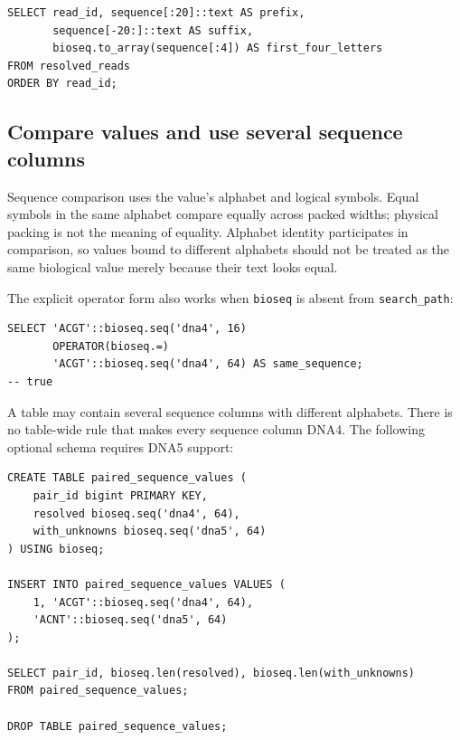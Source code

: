 \par\noindent\begin{minipage}{\linewidth}
\begin{lstlisting}[style=bioseq-appendix-sql]
SELECT read_id, sequence[:20]::text AS prefix,
       sequence[-20:]::text AS suffix,
       bioseq.to_array(sequence[:4]) AS first_four_letters
FROM resolved_reads
ORDER BY read_id;
\end{lstlisting}
\end{minipage}

\subsection{Compare values and use several sequence columns}

Sequence comparison uses the value's alphabet and logical symbols. Equal
symbols in the same alphabet compare equally across packed widths; physical
packing is not the meaning of equality. Alphabet identity participates in
comparison, so values bound to different alphabets should not be treated as
the same biological value merely because their text looks equal.

The explicit operator form also works when \texttt{bioseq} is absent from
\texttt{search\_path}:

\par\noindent\begin{minipage}{\linewidth}
\begin{lstlisting}[style=bioseq-appendix-sql]
SELECT 'ACGT'::bioseq.seq('dna4', 16)
       OPERATOR(bioseq.=)
       'ACGT'::bioseq.seq('dna4', 64) AS same_sequence;
-- true
\end{lstlisting}
\end{minipage}

A table may contain several sequence columns with different alphabets.
There is no table-wide rule that makes every sequence column DNA4. The
following optional schema requires DNA5 support:

\par\noindent\begin{minipage}{\linewidth}
\begin{lstlisting}[style=bioseq-appendix-sql]
CREATE TABLE paired_sequence_values (
    pair_id bigint PRIMARY KEY,
    resolved bioseq.seq('dna4', 64),
    with_unknowns bioseq.seq('dna5', 64)
) USING bioseq;

INSERT INTO paired_sequence_values VALUES (
    1, 'ACGT'::bioseq.seq('dna4', 64),
    'ACNT'::bioseq.seq('dna5', 64)
);

SELECT pair_id, bioseq.len(resolved), bioseq.len(with_unknowns)
FROM paired_sequence_values;

DROP TABLE paired_sequence_values;
\end{lstlisting}
\end{minipage}

